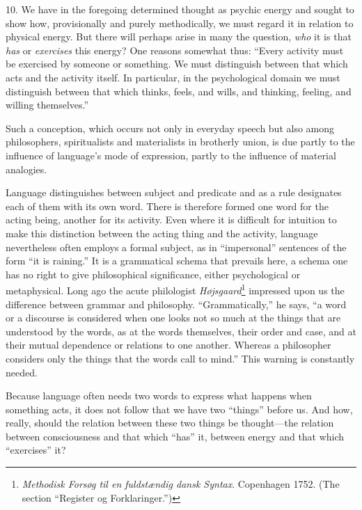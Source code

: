 \documentclass[12pt,a4paper]{book}
\newcommand{\opage}[1]{\marginnote{\footnotesize\textit{[#1]}}}
\begin{document}
10. We have in the foregoing determined thought as psychic energy and
sought to show how, provisionally and purely methodically, we must
regard it in relation to physical energy. But there will perhaps arise
in many the question, \emph{who} it is that \emph{has} or \emph{exercises}
this energy? One reasons somewhat thus: ``Every activity must be
exercised by someone or something. We must distinguish between that which
acts and the activity itself. In particular, in the psychological domain
we must distinguish between that which thinks, feels, and wills, and
thinking, feeling, and willing themselves.''

Such a conception, which occurs not only in everyday speech but also
among philosophers, spiritualists and materialists in brotherly union,
is due partly to the influence of language's mode of expression, partly
to the influence of material analogies.

Language distinguishes between subject and predicate and as a rule
designates each of them with its own word. There is therefore formed one
word for the acting being, another for its activity. Even where it is
difficult for intuition to make this distinction between the acting thing
and the activity, language nevertheless often employs a formal subject,
as in ``impersonal'' sentences of the form ``it is raining.'' It is a
grammatical schema that prevails here, a schema one has no right to give
philosophical significance, either psychological or metaphysical. Long
ago the acute philologist \emph{Højsgaard}\footnote{\emph{Methodisk
Forsøg til en fuldstændig dansk Syntax}. Copenhagen 1752. (The section
``Register og Forklaringer.'')} impressed upon us the difference between
grammar and philosophy. ``Grammatically,'' he says, ``a word or a
discourse is considered when one looks not so much at the things that are
understood by the words, as at the words themselves, their order and
case, and at their mutual dependence or relations to one another. Whereas
a philosopher considers only the things that the words call to mind.''
This warning is constantly needed.

\opage{35}Because language often needs two words to express what happens when
something acts, it does not follow that we have two ``things'' before
us. And how, really, should the relation between these two things be
thought---the relation between consciousness and that which ``has'' it,
between energy and that which ``exercises'' it?
\end{document}
